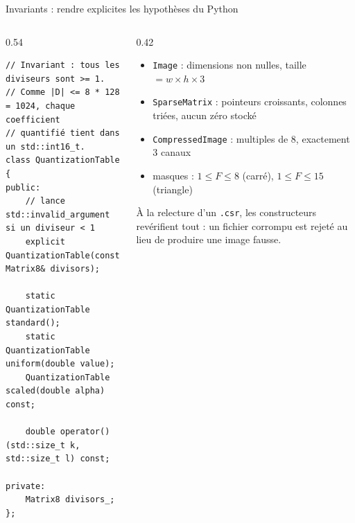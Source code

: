 \documentclass[aspectratio=169,10pt]{beamer}
\newcommand{\code}[1]{\texttt{#1}}
\begin{document}
\begin{frame}[fragile]{Invariants : rendre explicites les hypothèses du Python}
  \begin{columns}[T]
    \begin{column}{0.54\textwidth}
\begin{lstlisting}
// Invariant : tous les diviseurs sont >= 1.
// Comme |D| <= 8 * 128 = 1024, chaque coefficient
// quantifié tient dans un std::int16_t.
class QuantizationTable {
public:
    // lance std::invalid_argument si un diviseur < 1
    explicit QuantizationTable(const Matrix8& divisors);

    static QuantizationTable standard();
    static QuantizationTable uniform(double value);
    QuantizationTable scaled(double alpha) const;

    double operator()(std::size_t k, std::size_t l) const;

private:
    Matrix8 divisors_;
};
\end{lstlisting}
    \end{column}
    \begin{column}{0.42\textwidth}
      \begin{itemize}
        \item \code{Image} : dimensions non nulles, taille $= w \times h \times 3$
        \item \code{SparseMatrix} : pointeurs croissants, colonnes triées, aucun zéro stocké
        \item \code{CompressedImage} : multiples de 8, exactement 3 canaux
        \item masques : $1 \leq F \leq 8$ (carré), $1 \leq F \leq 15$ (triangle)
      \end{itemize}
      \vspace{0.5em}
      À la relecture d'un \code{.csr}, les constructeurs revérifient tout : un fichier
      corrompu est rejeté au lieu de produire une image fausse.
    \end{column}
  \end{columns}
\end{frame}
\end{document}
